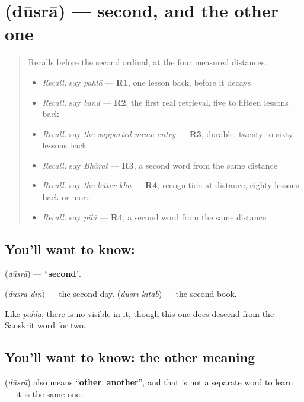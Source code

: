 \section[\texorpdfstring{\hi{दूसरा} / \hi{दूसरी} (dūsrā / dūsrī)}{दूसरा / दूसरी (dūsrā / dūsrī)}]{ (dūsrā) — second, and the other one}

\label{lesson:HI-C75-second}



\begin{quote}
Recalls before the second ordinal, at the four measured distances.

\begin{itemize}
\raggedright
  \item \emph{Recall:} say \emph{pahlā} — \textbf{R1}, one lesson back, before it decays
  \item \emph{Recall:} say \emph{band} — \textbf{R2}, the first real retrieval, five to fifteen lessons back
  \item \emph{Recall:} say \emph{the supported name entry} — \textbf{R3}, durable, twenty to sixty lessons back
  \item \emph{Recall:} say \emph{Bhārat} — \textbf{R3}, a second word from the same distance
  \item \emph{Recall:} say \emph{the letter kha} — \textbf{R4}, recognition at distance, eighty lessons back or more
  \item \emph{Recall:} say \emph{pīlā} — \textbf{R4}, a second word from the same distance
\end{itemize}
\end{quote}

\subsection*{You'll want to know: }
\textbf{} (\emph{dūsrā}) — \textquotedblleft{}\textbf{second}\textquotedblright{}.

\textbf{ } (\emph{dūsrā din}) — the second day. \textbf{ } (\emph{dūsrī kitāb}) — the second book.

Like \emph{pahlā}, there is no \textbf{} visible in it, though this one does descend from the Sanskrit word for two.

\subsection*{You'll want to know: the other meaning}
\textbf{} (\emph{dūsrā}) also means \textquotedblleft{}\textbf{other}, \textbf{another}\textquotedblright{}, and that is not a separate word to learn — it is the same one.


